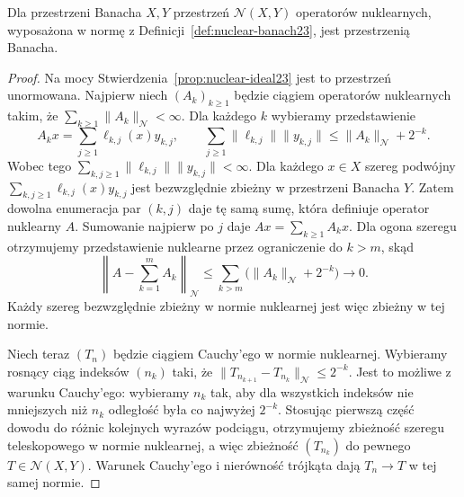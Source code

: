 \begin{twierdzenie}
\label{thm:dt-nuclear-norm-complete}
Dla przestrzeni Banacha $X,Y$ przestrzeń
$\mathcal N(X,Y)$ operatorów nuklearnych, wyposażona
w normę z Definicji~\ref{def:nuclear-banach23},
jest przestrzenią Banacha.
\end{twierdzenie}
\begin{proof}
Na mocy Stwierdzenia~\ref{prop:nuclear-ideal23}
jest to przestrzeń unormowana. Najpierw niech
$(A_k)_{k\ge1}$ będzie ciągiem operatorów nuklearnych
takim, że $\sum_{k\ge1}\|A_k\|_{\mathcal N}<\infty$.
Dla każdego $k$ wybieramy przedstawienie
\[
 A_kx=\sum_{j\ge1}\ell_{k,j}(x)y_{k,j},\qquad
 \sum_{j\ge1}\|\ell_{k,j}\|\|y_{k,j}\|
 \le\|A_k\|_{\mathcal N}+2^{-k}.
\]
Wobec tego
$\sum_{k,j\ge1}\|\ell_{k,j}\|\|y_{k,j}\|<\infty$.
Dla każdego $x\in X$ szereg podwójny
$\sum_{k,j\ge1}\ell_{k,j}(x)y_{k,j}$ jest bezwzględnie
zbieżny w przestrzeni Banacha $Y$. Zatem dowolna
enumeracja par $(k,j)$ daje tę samą sumę, która
definiuje operator nuklearny $A$. Sumowanie najpierw
po $j$ daje $Ax=\sum_{k\ge1}A_kx$.
Dla ogona szeregu otrzymujemy przedstawienie nuklearne
przez ograniczenie do $k>m$, skąd
\[
 \left\|A-\sum_{k=1}^m A_k\right\|_{\mathcal N}
 \le\sum_{k>m}\bigl(\|A_k\|_{\mathcal N}+2^{-k}\bigr)
 \longrightarrow0.
\]
Każdy szereg bezwzględnie zbieżny w normie nuklearnej
jest więc zbieżny w tej normie.

Niech teraz $(T_n)$ będzie ciągiem Cauchy'ego
w normie nuklearnej. Wybieramy rosnący ciąg indeksów
$(n_k)$ taki, że
$\|T_{n_{k+1}}-T_{n_k}\|_{\mathcal N}\le2^{-k}$.
Jest to możliwe z warunku Cauchy'ego: wybieramy $n_k$
tak, aby dla wszystkich indeksów nie mniejszych
niż $n_k$ odległość była co najwyżej $2^{-k}$.
Stosując pierwszą część dowodu do różnic kolejnych
wyrazów podciągu, otrzymujemy zbieżność szeregu
teleskopowego w normie nuklearnej, a więc zbieżność
$(T_{n_k})$ do pewnego $T\in\mathcal N(X,Y)$.
Warunek Cauchy'ego i nierówność trójkąta dają
$T_n\to T$ w tej samej normie.
\end{proof}

